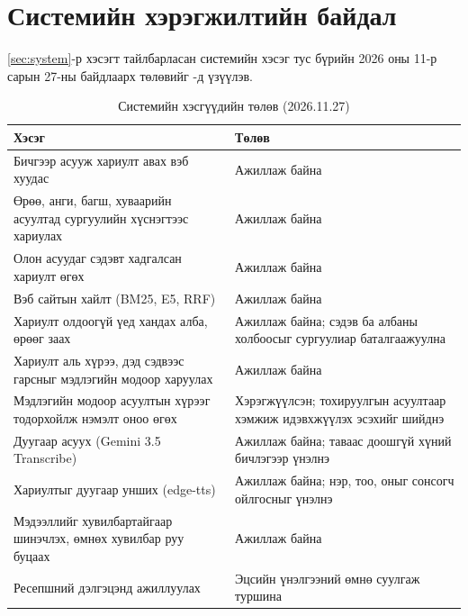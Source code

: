 \section{Системийн хэрэгжилтийн байдал}
\label{sec:res-system}

\ref{sec:system}-р хэсэгт тайлбарласан системийн хэсэг тус бүрийн 2026 оны 11-р сарын 27-ны байдлаарх төлөвийг -д үзүүлэв.

\begin{table}[htbp]
\centering
\caption{Системийн хэсгүүдийн төлөв (2026.11.27)}
\label{tab:system_status}
\begin{tabular}{|p{6.2cm}|p{7.6cm}|}
\hline
\textbf{Хэсэг} & \textbf{Төлөв} \\
\hline
Бичгээр асууж хариулт авах вэб хуудас & Ажиллаж байна \\
\hline
Өрөө, анги, багш, хуваарийн асуултад сургуулийн хүснэгтээс хариулах & Ажиллаж байна \\
\hline
Олон асуудаг сэдэвт хадгалсан хариулт өгөх & Ажиллаж байна \\
\hline
Вэб сайтын хайлт (BM25, E5, \acs{RRF}) & Ажиллаж байна \\
\hline
Хариулт олдоогүй үед хандах алба, өрөөг заах & Ажиллаж байна; сэдэв ба албаны холбоосыг сургуулиар баталгаажуулна \\
\hline
Хариулт аль хүрээ, дэд сэдвээс гарсныг мэдлэгийн модоор харуулах & Ажиллаж байна \\
\hline
Мэдлэгийн модоор асуултын хүрээг тодорхойлж нэмэлт оноо өгөх & Хэрэгжүүлсэн; тохируулгын асуултаар хэмжиж идэвхжүүлэх эсэхийг шийднэ \\
\hline
Дуугаар асуух (Gemini 3.5 Transcribe) & Ажиллаж байна; таваас доошгүй хүний бичлэгээр үнэлнэ \\
\hline
Хариултыг дуугаар унших (edge-tts) & Ажиллаж байна; нэр, тоо, оныг сонсогч ойлгосныг үнэлнэ \\
\hline
Мэдээллийг хувилбартайгаар шинэчлэх, өмнөх хувилбар руу буцаах & Ажиллаж байна \\
\hline
Ресепшний дэлгэцэнд ажиллуулах & Эцсийн үнэлгээний өмнө суулгаж туршина \\
\hline
\end{tabular}
\end{table}

